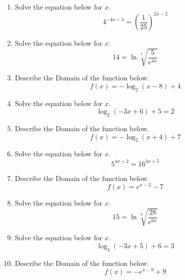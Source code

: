 \documentclass[14pt]{extbook}
\begin{document}
\begin{enumerate}
\item{
Solve the equation below for $x$.\[ 4^{-4x-4} = \left(\frac{1}{25}\right)^{2x-2} \]} \newpage
\item{
Solve the equation below for $x$.\[  14 = \ln{\sqrt[7]{\frac{5}{e^{4x}}}} \]} \newpage
\item{
Describe the Domain of the function below.\[ f(x) = -\log_2{(x-8)}+4 \]} \newpage
\item{
Solve the equation below for $x$.\[ \log_{2}{(-3x+6)}+5 = 2 \]} \newpage
\item{
Describe the Domain of the function below.\[ f(x) = -\log_2{(x+4)}+7 \]} \newpage
\item{
Solve the equation below for $x$.\[ 5^{4x+2} = 16^{3x+5} \]} \newpage
\item{
Describe the Domain of the function below.\[ f(x) = e^{x-2}-7 \]} \newpage
\item{
Solve the equation below for $x$.\[  15 = \ln{\sqrt[6]{\frac{28}{e^{6x}}}} \]} \newpage
\item{
Solve the equation below for $x$.\[ \log_{4}{(-3x+5)}+6 = 3 \]} \newpage
\item{
Describe the Domain of the function below.\[ f(x) = -e^{x-9}+9 \]} \newpage
\end{enumerate}
\end{document}
